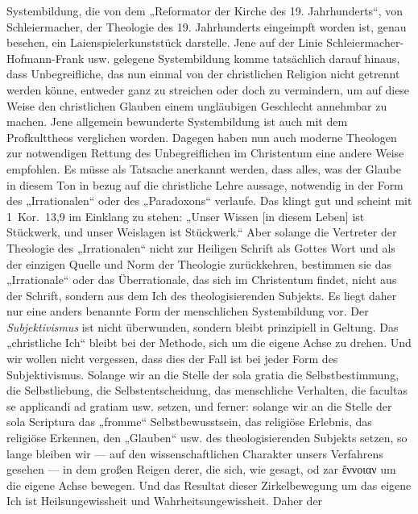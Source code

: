 Systembildung, die von dem „Reformator der Kirche des 19. Jahrhunderts“, von Schleiermacher, der Theologie des 19. Jahrhunderts eingeimpft worden ist, genau besehen, ein Laienspielerkunststück darstelle. Jene auf der Linie Schleiermacher-Hofmann-Frank usw. gelegene Systembildung komme tatsächlich darauf hinaus, dass Unbegreifliche, das nun einmal von der christlichen Religion nicht getrennt werden könne, entweder ganz zu streichen oder doch zu vermindern, um auf diese Weise den christlichen Glauben einem ungläubigen Geschlecht annehmbar zu machen. Jene allgemein bewunderte Systembildung ist auch mit dem Profkulttheos verglichen worden. Dagegen haben nun auch moderne Theologen zur notwendigen Rettung des Unbegreiflichen im Christentum eine andere Weise empfohlen. Es müsse als Tatsache anerkannt werden, dass alles, was der Glaube in diesem Ton in bezug auf die christliche Lehre aussage, notwendig in der Form des „Irrationalen“ oder des „Paradoxons“ verlaufe. Das klingt gut und scheint mit 1~Kor.~13,9 im Einklang zu stehen: „Unser Wissen [in diesem Leben] ist Stückwerk, und unser Weislagen ist Stückwerk.“ Aber solange die Vertreter der Theologie des „Irrationalen“ nicht zur Heiligen Schrift als Gottes Wort und als der einzigen Quelle und Norm der Theologie zurückkehren, bestimmen sie das „Irrationale“ oder das Überrationale, das sich im Christentum findet, nicht aus der Schrift, sondern aus dem Ich des theologisierenden Subjekts. Es liegt daher nur eine anders benannte Form der menschlichen Systembildung vor. Der \emph{Subjektivismus} ist nicht überwunden, sondern bleibt prinzipiell in Geltung. Das „christliche Ich“ bleibt bei der Methode, sich um die eigene Achse zu drehen. Und wir wollen nicht vergessen, dass dies der Fall ist bei jeder Form des Subjektivismus. Solange wir an die Stelle der sola gratia die Selbstbestimmung, die Selbstliebung, die Selbstentscheidung, das menschliche Verhalten, die facultas se applicandi ad gratiam usw. setzen, und ferner: solange wir an die Stelle der sola Scriptura das „fromme“ Selbstbewusstsein, das religiöse Erlebnis, das religiöse Erkennen, den „Glauben“ usw. des theologisierenden Subjekts setzen, so lange bleiben wir --- auf den wissenschaftlichen Charakter unsers Verfahrens gesehen --- in dem großen Reigen derer, die sich, wie gesagt, od zar \textgreek{ἔννοιαν} um die eigene Achse bewegen. Und das Resultat dieser Zirkelbewegung um das eigene Ich ist Heilsungewissheit und Wahrheitsungewissheit. Daher der